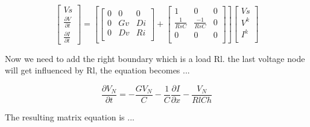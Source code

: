 \documentclass[12pt, letterpaper]{article}
\begin{document}
\begin{equation}
	\begin{bmatrix}
		Vs \\
		\frac{\partial{V}}{\partial{t}} \\
		\frac{\partial{I}}{\partial{t}} 
	\end{bmatrix}	
	=
	\left[ 
	\begin{bmatrix}
		0 & 0 & 0 \\
		0 & Gv & Di \\
		0 & Dv & Ri \\
	\end{bmatrix}
	+
		\begin{bmatrix}
		1 & 0 & 0 \\
		\frac{1}{Rs C} & \frac{-1}{Rs C} & 0 \\
		0 & 0 & 0 \\
	\end{bmatrix}
	\right]
	\begin{bmatrix}
		Vs \\
		V^k \\
		I^k \\
	\end{bmatrix}
\end{equation}

Now we need to add the right boundary which is a load Rl. the last voltage node will get influenced by Rl, the equation becomes ...

\begin{equation} \frac{\partial{V_N}}{\partial{t}} = -\frac{G V_N}{C} - \frac{1}{C} \frac{\partial{I}}{\partial{x}} - \frac{V_N}{Rl C h}
\end{equation}

The resulting matrix equation is ...
\end{document}

